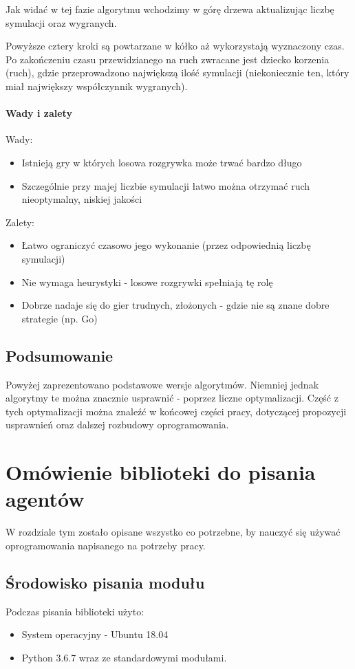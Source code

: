 \documentclass[polish,shortabstract,inz]{iithesis}
\begin{document}


Jak widać w tej fazie algorytmu wchodzimy w górę drzewa aktualizując liczbę symulacji oraz wygranych.

Powyższe cztery kroki są powtarzane w kółko aż wykorzystają wyznaczony czas.
Po zakończeniu czasu przewidzianego na ruch zwracane jest dziecko korzenia (ruch), gdzie przeprowadzono największą ilość symulacji (niekoniecznie ten, który miał największy współczynnik wygranych).

\subsubsection{Wady i zalety}
Wady:
\begin{itemize}
  \item Istnieją gry w których losowa rozgrywka może trwać bardzo długo
  \item Szczególnie przy majej liczbie symulacji łatwo można otrzymać ruch nieoptymalny, niskiej jakości
\end{itemize}
Zalety:
\begin{itemize}
  \item Łatwo ograniczyć czasowo jego wykonanie (przez odpowiednią liczbę symulacji)
  \item Nie wymaga heurystyki - losowe rozgrywki spełniają tę rolę
  \item Dobrze nadaje się do gier trudnych, złożonych - gdzie nie są znane dobre strategie (np. Go)
\end{itemize}

\section{Podsumowanie}
Powyżej zaprezentowano podstawowe wersje algorytmów.
Niemniej jednak algorytmy te można znacznie usprawnić - poprzez liczne optymalizacji.
Część z tych optymalizacji można znaleźć w końcowej części pracy, dotyczącej propozycji usprawnień oraz dalszej rozbudowy oprogramowania.


\chapter{Omówienie biblioteki do pisania agentów}
W rozdziale tym zostało opisane wszystko co potrzebne, by nauczyć się używać oprogramowania napisanego na potrzeby pracy.
\section{Środowisko pisania modułu}
Podczas pisania biblioteki użyto:
\begin{itemize}
  \item System operacyjny - Ubuntu 18.04
  \item Python 3.6.7 wraz ze standardowymi modułami.
\end{itemize}
\end{document}
